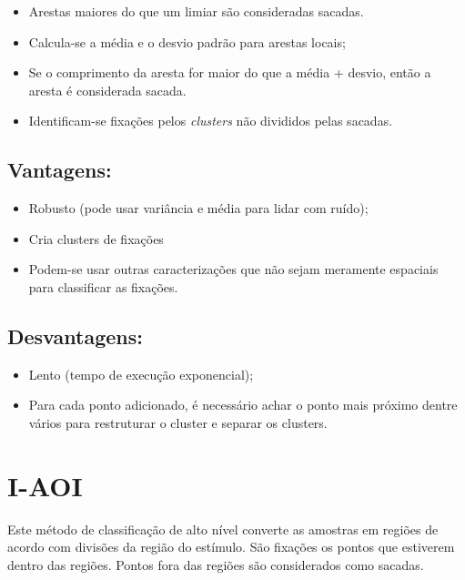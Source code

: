 \documentclass[brazil,]{report}
\begin{document}
\begin{itemize}
\itemsep1pt\parskip0pt
\item
  Arestas maiores do que um limiar são consideradas sacadas.
\item
  Calcula-se a média e o desvio padrão para arestas locais;
\item
  Se o comprimento da aresta for maior do que a média + desvio, então a
  aresta é considerada sacada.
\item
  Identificam-se fixações pelos \emph{clusters} não divididos pelas
  sacadas.
\end{itemize}

\subsection{Vantagens:}\label{vantagens-3}

\begin{itemize}
\itemsep1pt\parskip0pt
\item
  Robusto (pode usar variância e média para lidar com ruído);
\item
  Cria clusters de fixações
\item
  Podem-se usar outras caracterizações que não sejam meramente espaciais
  para classificar as fixações.
\end{itemize}

\subsection{Desvantagens:}\label{desvantagens-3}

\begin{itemize}
\itemsep1pt\parskip0pt
\item
  Lento (tempo de execução exponencial);
\item
  Para cada ponto adicionado, é necessário achar o ponto mais próximo
  dentre vários para restruturar o cluster e separar os clusters.
\end{itemize}

\section{I-AOI}\label{i-aoi}

Este método de classificação de alto nível converte as amostras em
regiões de acordo com divisões da região do estímulo. São fixações os
pontos que estiverem dentro das regiões. Pontos fora das regiões são
considerados como sacadas.
\end{document}
